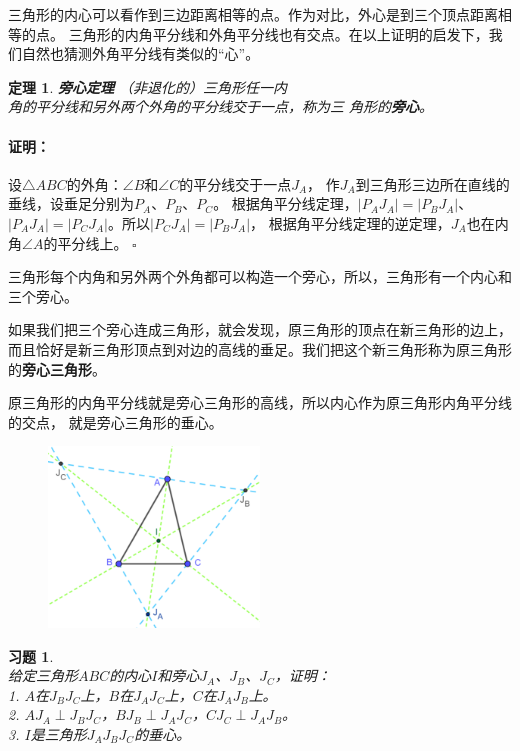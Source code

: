 \documentclass[12pt,UTF8]{ctexbook}
\newtheorem{tm}{定理}[section]
\newenvironment{proof2}{\paragraph{\textbf{证明：}}}{\hfill$\square$}
\newtheorem{xt}{习题}[section]
\begin{document}
三角形的内心可以看作到三边距离相等的点。作为对比，外心是到三个顶点距离相等的点。
三角形的内角平分线和外角平分线也有交点。在以上证明的启发下，我们自然也猜测外角平分线有类似的“心”。

\begin{tm}{\textbf{旁心定理 }}\label{tm:1-2-1}
    （非退化的）三角形任一内\\
    角的平分线和另外两个外角的平分线交于一点，称为三
    角形的\textbf{旁心}。
\end{tm}

\begin{proof2}
    设$\triangle ABC$的外角：$\angle B$和$\angle C$的平分线交于一点$J_A$，
    作$J_A$到三角形三边所在直线的垂线，设垂足分别为$P_A$、$P_B$、$P_C$。
    根据角平分线定理，$|P_AJ_A| = |P_BJ_A|$、$|P_AJ_A| = |P_CJ_A|$。所以$|P_CJ_A| = |P_BJ_A|$，
    根据角平分线定理的逆定理，$J_A$也在内角$\angle A$的平分线上。
\end{proof2}

三角形每个内角和另外两个外角都可以构造一个旁心，所以，三角形有一个内心和三个旁心。

如果我们把三个旁心连成三角形，就会发现，原三角形的顶点在新三角形的边上，
而且恰好是新三角形顶点到对边的高线的垂足。我们把这个新三角形称为原三角形的\textbf{旁心三角形}。

原三角形的内角平分线就是旁心三角形的高线，所以内心作为原三角形内角平分线的交点，
就是旁心三角形的垂心。

\begin{figure}[h] %
    \centering
    \vspace{10pt}
    \includegraphics[width=0.5\textwidth]{tu/三角形内心旁心.png}
\end{figure}

\begin{xt}\label{xt:1-2-0}
    \mbox{}\\
    给定三角形$ABC$的内心$I$和旁心$J_A$、$J_B$、$J_C$，证明：\\
    1. $A$在$J_BJ_C$上，$B$在$J_AJ_C$上，$C$在$J_AJ_B$上。\\
    2. $AJ_A \perp J_BJ_C$，$BJ_B \perp J_AJ_C$，$CJ_C \perp J_AJ_B$。\\
    3. $I$是三角形$J_AJ_BJ_C$的垂心。
\end{xt}
\end{document}
